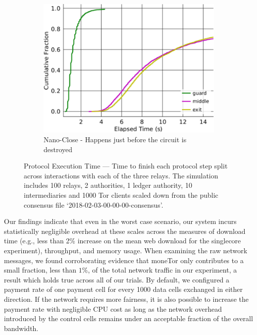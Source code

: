 \begin{figure}[t]
\begin{subfigure}[t]{0.32\textwidth}
    \label{fig:ttfp}
  \end{subfigure}
  \begin{subfigure}[t]{0.32\textwidth} \centering
    \includegraphics[trim={0 0cm 0 0cm}, clip, width=1.0\textwidth]{images/payment_close.pdf}
    \caption{Nano-Close - Happens just before the circuit is destroyed}
    \label{fig:payments_close}
  \end{subfigure}
  \caption{Protocol Execution Time --- Time to finish each protocol step split across interactions with each of the three relays.
    The simulation includes 100 relays, 2 authorities, 1 ledger authority, 10 intermediaries and 1000 Tor clients scaled down from the public consensus file `2018-02-03-00-00-00-consensus'.}
  \label{fig:latencymeasurements}
\end{figure}

Our findings indicate that even in the worst case scenario, our system incurs statistically negligible overhead at these scales across the measures of download time (e.g., less than 2\% increase on the mean web download for the singlecore experiment), throughput, and memory usage.
When examining the raw network messages, we found corroborating evidence that moneTor only contributes to a small fraction, less than $1\%$, of the total network traffic in our experiment, a result which holds true across all of our trials.
By default, we configured a payment rate of one payment cell for every 1000 data cells exchanged in either direction.
If the network requires more fairness, it is also possible to increase the payment rate with negligible CPU cost as long as the network overhead introduced by the control cells remains under an acceptable fraction of the overall bandwidth.

